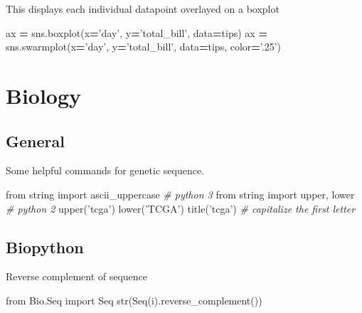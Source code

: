 \documentclass[]{book}
\newenvironment{Shaded}{\begin{snugshade}}{\end{snugshade}}
\newcommand{\StringTok}[1]{\textcolor[rgb]{0.31,0.60,0.02}{#1}}
\newcommand{\ImportTok}[1]{#1}
\newcommand{\CommentTok}[1]{\textcolor[rgb]{0.56,0.35,0.01}{\textit{#1}}}
\newcommand{\OperatorTok}[1]{\textcolor[rgb]{0.81,0.36,0.00}{\textbf{#1}}}
\newcommand{\BuiltInTok}[1]{#1}
\newcommand{\NormalTok}[1]{#1}
\begin{document}
This displays each individual datapoint overlayed on a boxplot

\begin{Shaded}
\begin{Highlighting}[]
\NormalTok{ax }\OperatorTok{=}\NormalTok{ sns.boxplot(x}\OperatorTok{=}\StringTok{'day'}\NormalTok{, y}\OperatorTok{=}\StringTok{'total_bill'}\NormalTok{, data}\OperatorTok{=}\NormalTok{tips)}
\NormalTok{ax }\OperatorTok{=}\NormalTok{ sns.swarmplot(x}\OperatorTok{=}\StringTok{'day'}\NormalTok{, y}\OperatorTok{=}\StringTok{'total_bill'}\NormalTok{, data}\OperatorTok{=}\NormalTok{tips, color}\OperatorTok{=}\StringTok{'.25'}\NormalTok{)}
\end{Highlighting}
\end{Shaded}

\chapter{Biology}\label{biology}

\section{General}\label{general-1}

Some helpful commands for genetic sequence.

\begin{Shaded}
\begin{Highlighting}[]
\ImportTok{from}\NormalTok{ string }\ImportTok{import}\NormalTok{ ascii_uppercase }\CommentTok{# python 3}
\ImportTok{from}\NormalTok{ string }\ImportTok{import}\NormalTok{ upper, lower }\CommentTok{# python 2}
\NormalTok{upper(}\StringTok{'tcga'}\NormalTok{)}
\NormalTok{lower(}\StringTok{'TCGA'}\NormalTok{)}
\NormalTok{title(}\StringTok{'tcga'}\NormalTok{) }\CommentTok{# capitalize the first letter}
\end{Highlighting}
\end{Shaded}

\section{Biopython}\label{biopython}

Reverse complement of sequence

\begin{Shaded}
\begin{Highlighting}[]
\ImportTok{from}\NormalTok{ Bio.Seq }\ImportTok{import}\NormalTok{ Seq}
\BuiltInTok{str}\NormalTok{(Seq(i).reverse_complement())}
\end{Highlighting}
\end{Shaded}
\end{document}
